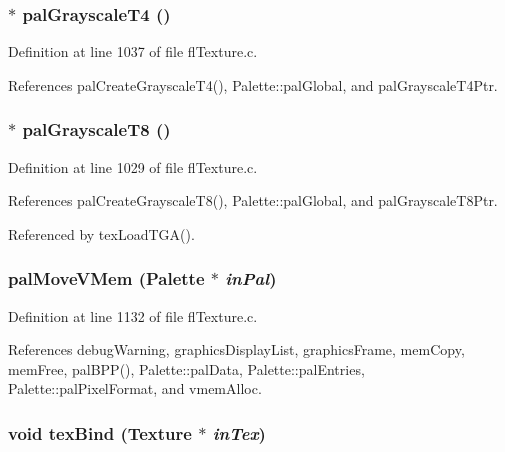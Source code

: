 \subsubsection{$\ast$ pal\-Grayscale\-T4 ()}\label{flTexture_8h_da86a59d2bc5f0c599fa03520fddf2d1}




Definition at line 1037 of file fl\-Texture.c.

References pal\-Create\-Grayscale\-T4(), Palette::pal\-Global, and pal\-Grayscale\-T4Ptr.
\subsubsection{$\ast$ pal\-Grayscale\-T8 ()}\label{flTexture_8h_113e5035bc82299348d36164c91e76c6}




Definition at line 1029 of file fl\-Texture.c.

References pal\-Create\-Grayscale\-T8(), Palette::pal\-Global, and pal\-Grayscale\-T8Ptr.

Referenced by tex\-Load\-TGA().
\subsubsection{ pal\-Move\-VMem ({\bf Palette} $\ast$ {\em in\-Pal})}\label{flTexture_8h_9d39735408cff76e1af6a14b07c9e93f}




Definition at line 1132 of file fl\-Texture.c.

References debug\-Warning, graphics\-Display\-List, graphics\-Frame, mem\-Copy, mem\-Free, pal\-BPP(), Palette::pal\-Data, Palette::pal\-Entries, Palette::pal\-Pixel\-Format, and vmem\-Alloc.
\subsubsection{\setlength{\rightskip}{0pt plus 5cm}void tex\-Bind ({\bf Texture} $\ast$ {\em in\-Tex})}\label{flTexture_8h_83362b9a35e8267e6e24cc103e864cda}




